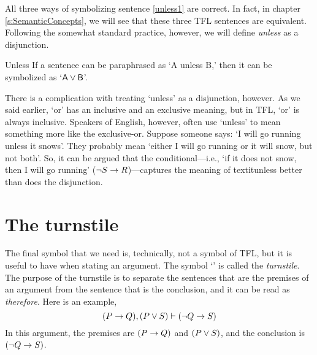 All three ways of symbolizing sentence \ref{unless1} are correct. In fact, in chapter \ref{s:SemanticConcepts}, we will see that these three TFL sentences are equivalent. Following the somewhat standard practice, however, we will define \textit{unless} as a disjunction.
	
\begin{factboxy}{Unless}
If a sentence can be paraphrased as `A unless B,' then it can be symbolized as `$\mathsf{A}\vee\mathsf{B}$'.
\end{factboxy}

There is a complication with treating `unless' as a disjunction, however. As we said earlier, `or' has an inclusive and an exclusive meaning, but in TFL, `or' is always inclusive. Speakers of English, however, often use `unless' to mean something more like the exclusive-or. Suppose someone says: `I will go running unless it snows'. They probably mean `either I will go running or it will snow, but not both'. So, it can be argued that the conditional---i.e., `if it does not snow, then I will go running' (${\neg} S \rightarrow R$)---captures the meaning of textit{unless} better than does the disjunction.


\section{The turnstile}

The final symbol that we need is, technically, not a symbol of TFL, but it is useful to have when stating an argument. The symbol `\proves' is called the \textit{turnstile}. The purpose of the turnstile is to separate the sentences that are the premises of an argument from the sentence that is the conclusion, and it can be read as \textit{therefore}. Here is an example,
$$(P \rightarrow Q), (P \vee S) \vdash ({\neg} Q \rightarrow S)$$
In this argument, the premises are $(P \rightarrow Q)$ and $(P \vee S)$, and the conclusion is $({\neg} Q \rightarrow S)$.







